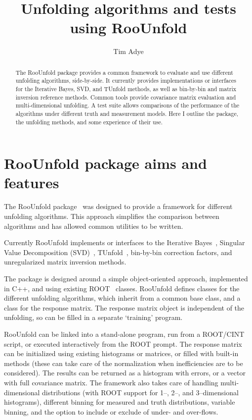 \documentclass{cernrep}
\title{Unfolding algorithms and tests using RooUnfold}
\author{Tim Adye}
\institute{Rutherford Appleton Laboratory, Science and Technology Facilities Council,\\
Harwell Science and Innovation Campus, Didcot OX11 0QX, United Kingdom.}
\begin{document}
\maketitle
\begin{abstract}
The RooUnfold package provides a common framework to evaluate and use
different unfolding algorithms, side-by-side. It currently provides
implementations or interfaces for the Iterative Bayes, SVD, and
TUnfold methods, as well as bin-by-bin and matrix inversion reference
methods. Common tools provide covariance matrix evaluation and
multi-dimensional unfolding. A test suite allows comparisons of the
performance of the algorithms under different truth and measurement models.
Here I outline the package, the unfolding methods, and some experience of their use.
\end{abstract}

\section{RooUnfold package aims and features}

The RooUnfold package~\cite{RooUnfold-web} was designed to provide a framework for different unfolding algorithms.
This approach simplifies the comparison between algorithms and has allowed
common utilities to be written.

Currently RooUnfold implements or interfaces to the Iterative Bayes~\cite{D'Agostini:1994zf,Bierwagen:PHYSTAT2011},
Singular Value Decomposition (SVD)~\cite{Hocker:1995kb,Kartvelishvili:PHYSTAT2011,Tackmann:PHYSTAT2011},
TUnfold~\cite{Schmitt-web}, bin-by-bin correction factors, and unregularized matrix inversion methods.

The package is designed around a simple object-oriented approach, implemented in
C++, and using existing ROOT~\cite{Brun:1997pa} classes. RooUnfold defines classes for the different
unfolding algorithms, which inherit from a common base class, and a class for
the response matrix. The response matrix object is independent of the unfolding,
so can be filled in a separate `training' program.

RooUnfold can be linked into a stand-alone program, run from a ROOT/CINT script, or
executed interactively from the ROOT prompt.
The response matrix can be initialized using existing histograms or matrices, or
filled with built-in methods (these can take care of the normalization when inefficiencies are to be considered).
The results can be returned as a histogram with errors, or a vector with full covariance matrix.
The framework also takes care of handling multi-dimensional distributions
(with ROOT support for 1--, 2--, and 3--dimensional histograms),
different binning for measured and truth distributions,
variable binning, and the option to include or exclude of under- and over-flows.
\end{document}
